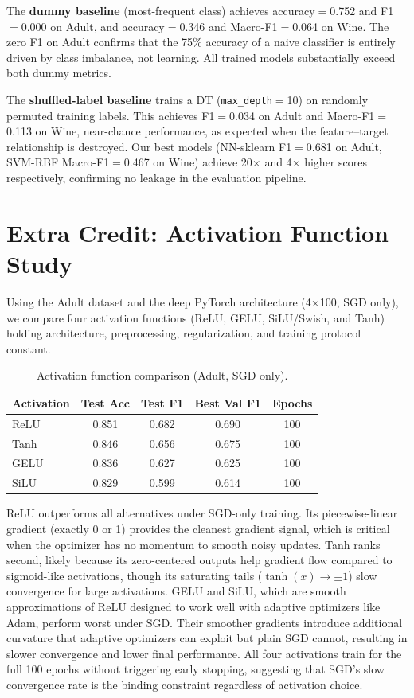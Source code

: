 \documentclass[10pt,twocolumn]{article}
\begin{document}
The \textbf{dummy baseline} (most-frequent class) achieves accuracy$=$0.752 and F1$=$0.000 on Adult, and accuracy$=$0.346 and Macro-F1$=$0.064 on Wine. The zero F1 on Adult confirms that the 75\% accuracy of a naive classifier is entirely driven by class imbalance, not learning. All trained models substantially exceed both dummy metrics.

The \textbf{shuffled-label baseline} trains a DT (\texttt{max\_depth}$=$10) on randomly permuted training labels. This achieves F1$=$0.034 on Adult and Macro-F1$=$0.113 on Wine, near-chance performance, as expected when the feature--target relationship is destroyed. Our best models (NN-sklearn F1$=$0.681 on Adult, SVM-RBF Macro-F1$=$0.467 on Wine) achieve 20$\times$ and 4$\times$ higher scores respectively, confirming no leakage in the evaluation pipeline.

\section{Extra Credit: Activation Function Study}

Using the Adult dataset and the deep PyTorch architecture (4$\times$100, SGD only), we compare four activation functions (ReLU, GELU, SiLU/Swish, and Tanh) holding architecture, preprocessing, regularization, and training protocol constant.

\begin{table}[H]
\centering
\caption{Activation function comparison (Adult, SGD only).}
\label{tab:activation}
\small
\begin{tabular}{lcccc}
\toprule
Activation & Test Acc & Test F1 & Best Val F1 & Epochs \\
\midrule
ReLU & 0.851 & 0.682 & 0.690 & 100 \\
Tanh & 0.846 & 0.656 & 0.675 & 100 \\
GELU & 0.836 & 0.627 & 0.625 & 100 \\
SiLU & 0.829 & 0.599 & 0.614 & 100 \\
\bottomrule
\end{tabular}
\end{table}

ReLU outperforms all alternatives under SGD-only training. Its piecewise-linear gradient (exactly 0 or 1) provides the cleanest gradient signal, which is critical when the optimizer has no momentum to smooth noisy updates. Tanh ranks second, likely because its zero-centered outputs help gradient flow compared to sigmoid-like activations, though its saturating tails ($\tanh(x) \to \pm 1$) slow convergence for large activations. GELU and SiLU, which are smooth approximations of ReLU designed to work well with adaptive optimizers like Adam, perform worst under SGD. Their smoother gradients introduce additional curvature that adaptive optimizers can exploit but plain SGD cannot, resulting in slower convergence and lower final performance. All four activations train for the full 100 epochs without triggering early stopping, suggesting that SGD's slow convergence rate is the binding constraint regardless of activation choice.
\end{document}
